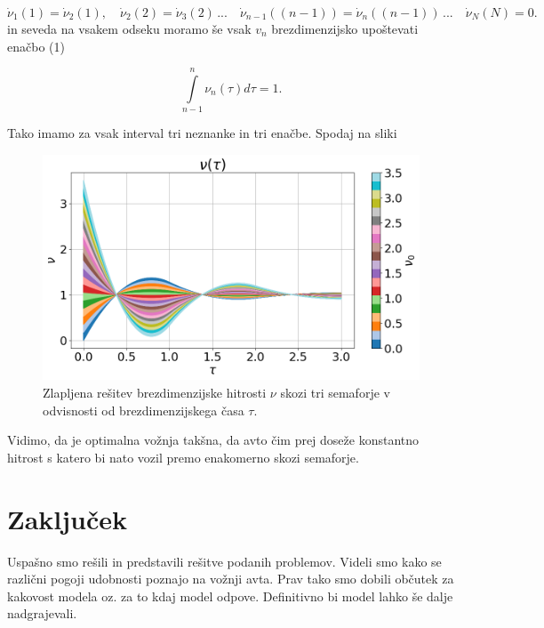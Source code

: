 \documentclass[slovene,11pt,a4paper]{article}
\begin{document}
\[
\dot{\nu}_1(1) = \dot{\nu}_2(1), \quad \dot{\nu}_2(2) = \dot{\nu}_3(2) \, ... \quad \dot{\nu}_{n-1}((n-1)) = \dot{\nu}_{n}((n-1)) \, ... \quad \dot{\nu}_{N}(N) = 0.
\]
in seveda na vsakem odseku moramo še vsak $v_n$ brezdimenzijsko upoštevati enačbo (1)

\begin{equation}
\int\limits^{n}_{n-1} \nu_n(\tau) d\tau = 1.
\end{equation}

Tako imamo za vsak interval tri neznanke in tri enačbe. Spodaj na sliki 

\begin{figure}[h!]
\centering
\includegraphics[width=\linewidth]{HitrostZaporedniSemaforji1.png}
\caption{Zlapljena rešitev brezdimenzijske hitrosti $\nu$ skozi tri semaforje v odvisnosti od brezdimenzijskega časa $\tau$.}
\end{figure}
Vidimo, da je optimalna vožnja takšna, da avto čim prej doseže konstantno hitrost s katero bi nato vozil premo enakomerno skozi semaforje.

\section{Zaključek}

Uspašno smo rešili in predstavili rešitve podanih problemov. Videli smo kako se različni pogoji udobnosti poznajo na vožnji avta. Prav tako smo dobili občutek za kakovost modela oz. za to kdaj model odpove. Definitivno bi model lahko še dalje nadgrajevali.
\end{document}
